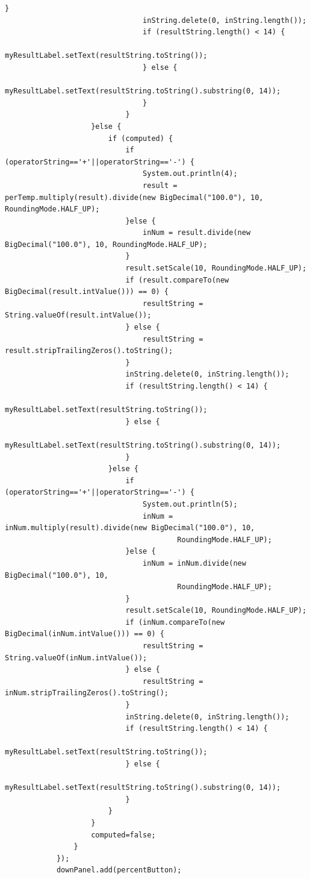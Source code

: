 \documentclass{ctexart}
\begin{document}
\begin{lstlisting}[caption=冗杂的代码]
                                }
                                inString.delete(0, inString.length());
                                if (resultString.length() < 14) {
                                    myResultLabel.setText(resultString.toString());
                                } else {
                                    myResultLabel.setText(resultString.toString().substring(0, 14));
                                } 
                            }
                    }else {
                        if (computed) {
                            if (operatorString=='+'||operatorString=='-') {
                                System.out.println(4);
                                result = perTemp.multiply(result).divide(new BigDecimal("100.0"), 10, RoundingMode.HALF_UP);
                            }else {
                                inNum = result.divide(new BigDecimal("100.0"), 10, RoundingMode.HALF_UP);
                            }
                            result.setScale(10, RoundingMode.HALF_UP);
                            if (result.compareTo(new BigDecimal(result.intValue())) == 0) {
                                resultString = String.valueOf(result.intValue());
                            } else {
                                resultString = result.stripTrailingZeros().toString();
                            }
                            inString.delete(0, inString.length());
                            if (resultString.length() < 14) {
                                myResultLabel.setText(resultString.toString());
                            } else {
                                myResultLabel.setText(resultString.toString().substring(0, 14));
                            } 
                        }else {
                            if (operatorString=='+'||operatorString=='-') {
                                System.out.println(5);
                                inNum = inNum.multiply(result).divide(new BigDecimal("100.0"), 10,
                                        RoundingMode.HALF_UP);
                            }else {
                                inNum = inNum.divide(new BigDecimal("100.0"), 10,
                                        RoundingMode.HALF_UP);
                            }
                            result.setScale(10, RoundingMode.HALF_UP);
                            if (inNum.compareTo(new BigDecimal(inNum.intValue())) == 0) {
                                resultString = String.valueOf(inNum.intValue());
                            } else {
                                resultString = inNum.stripTrailingZeros().toString();
                            }
                            inString.delete(0, inString.length());
                            if (resultString.length() < 14) {
                                myResultLabel.setText(resultString.toString());
                            } else {
                                myResultLabel.setText(resultString.toString().substring(0, 14));
                            }
                        }
                    }
                    computed=false;
                }
            });
            downPanel.add(percentButton);
            

\end{lstlisting}
\end{document}
